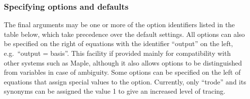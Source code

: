 \subsubsection{Specifying options and defaults}
\hypertarget{switch:ODESOLVE_EXPLICIT}{}
\hypertarget{switch:ODESOLVE_EXPAND}{}
\hypertarget{switch:ODESOLVE_FULL}{}
\hypertarget{switch:ODESOLVE_IMPLICIT}{}
\hypertarget{switch:ODESOLVE_NOINT}{}
\hypertarget{switch:ODESOLVE_VERBOSE}{}
\hypertarget{switch:ODESOLVE_BASIS}{}
\hypertarget{switch:TRODE}{}
\hypertarget{switch:ODESOLVE_FAST}{}
\hypertarget{switch:ODESOLVE_CHECK}{}

The final arguments may be one or more of the option identifiers
listed in the table below, which take precedence over the default
settings.  All options can also be specified on the right of equations
with the identifier ``output'' on the left, e.g.\ ``output = basis''.
This facility if provided mainly for compatibility with other systems
such as Maple, although it also allows options to be distinguished
from variables in case of ambiguity.  Some options can be specified on
the left of equations that assign special values to the option.
Currently, only ``trode'' and its synonyms can be assigned the value 1
to give an increased level of tracing.

